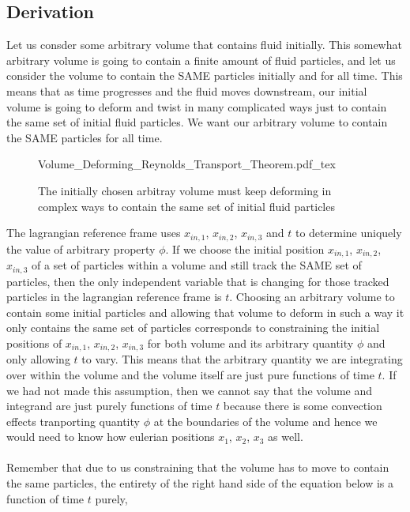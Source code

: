 \subsection{Derivation}
\begin{comment}
\end{comment}
Let us consder some arbitrary volume that contains fluid initially.
This somewhat arbitrary volume is going to contain a finite amount of fluid particles, and let us consider the volume to contain the SAME particles initially and for all time.
This means that as time progresses and the fluid moves downstream, our initial volume is going to deform and twist in many complicated ways just to contain the same set of initial fluid particles.
We want our arbitrary volume to contain the SAME particles for all time.
\begin{figure}[H]\centering
\def\svgwidth{400px}
{Volume_Deforming_Reynolds_Transport_Theorem.pdf_tex}
\caption{The initially chosen arbitray volume must keep deforming in complex ways to contain the same set of initial fluid particles}
\label{Volume Deforming Reynolds Transport Theorem}
\end{figure}
The lagrangian reference frame uses $x_{in,1}$, $x_{in,2}$, $x_{in,3}$ and $t$ to determine uniquely the value of arbitrary property $\phi$.
If we choose the initial position $x_{in,1}$, $x_{in,2}$, $x_{in,3}$ of a set of particles within a volume and still track the SAME set of particles, then the only independent variable that is changing for those tracked particles in the lagrangian reference frame is $t$.
Choosing an arbitrary volume to contain some initial particles and allowing that volume to deform in such a way it only contains the same set of particles corresponds to constraining the initial positions of $x_{in,1}$, $x_{in,2}$, $x_{in,3}$ for both volume and its arbitrary quantity $\phi$ and only allowing $t$ to vary.
This means that the arbitrary quantity we are integrating over within the volume and the volume itself are just pure functions of time $t$. 
If we had not made this assumption, then we cannot say that the volume and integrand are just purely functions of time $t$ because there is some convection effects tranporting quantity $\phi$ at the boundaries of the volume and hence we would need to know how eulerian positions $x_{1}$, $x_{2}$, $x_{3}$ as well.
\\~\\Remember that due to us constraining that the volume has to move to contain the same particles, the entirety of the right hand side of the equation below is a function of time $t$ purely,
